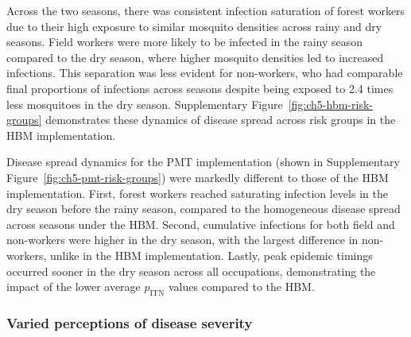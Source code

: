 Across the two seasons, there was consistent infection saturation of forest workers due to their high exposure to similar mosquito densities across rainy and dry seasons. Field workers were more likely to be infected in the rainy season compared to the dry season, where higher mosquito densities led to increased infections. This separation was less evident for non-workers, who had comparable final proportions of infections across seasons despite being exposed to 2.4 times less mosquitoes in the dry season. Supplementary Figure~\ref{fig:ch5-hbm-risk-groups} demonstrates these dynamics of disease spread across risk groups in the HBM implementation. 

Disease spread dynamics for the PMT implementation (shown in Supplementary Figure~\ref{fig:ch5-pmt-risk-groups}) were markedly different to those of the HBM implementation. First, forest workers reached saturating infection levels in the dry season before the rainy season, compared to the homogeneous disease spread across seasons under the HBM. Second, cumulative infections for both field and non-workers were higher in the dry season, with the largest difference in non-workers, unlike in the HBM implementation. Lastly, peak epidemic timings occurred sooner in the dry season across all occupations, demonstrating the impact of the lower average $p_{\text{ITN}}$ values compared to the HBM.


\subsubsection{Varied perceptions of disease severity}

\begin{figure}[hbt!]
     \centering
    \label{fig:ex2-p-beh}
\end{figure}

